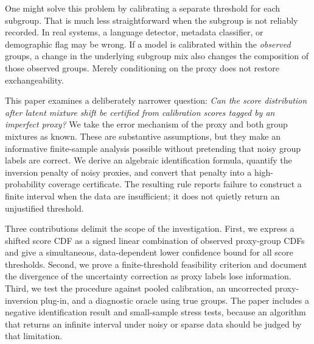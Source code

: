 \documentclass[twoside,11pt]{article}
\begin{document}
One might solve this problem by calibrating a separate threshold for each subgroup. That is much less straightforward when the subgroup is not reliably recorded. In real systems, a language detector, metadata classifier, or demographic flag may be wrong. If a model is calibrated within the \emph{observed} groups, a change in the underlying subgroup mix also changes the composition of those observed groups. Merely conditioning on the proxy does not restore exchangeability.

This paper examines a deliberately narrower question: \emph{Can the score distribution after latent mixture shift be certified from calibration scores tagged by an imperfect proxy?} We take the error mechanism of the proxy and both group mixtures as known. These are substantive assumptions, but they make an informative finite-sample analysis possible without pretending that noisy group labels are correct. We derive an algebraic identification formula, quantify the inversion penalty of noisy proxies, and convert that penalty into a high-probability coverage certificate. The resulting rule reports failure to construct a finite interval when the data are insufficient; it does not quietly return an unjustified threshold.

Three contributions delimit the scope of the investigation. First, we express a shifted score CDF as a signed linear combination of observed proxy-group CDFs and give a simultaneous, data-dependent lower confidence bound for all score thresholds. Second, we prove a finite-threshold feasibility criterion and document the divergence of the uncertainty correction as proxy labels lose information. Third, we test the procedure against pooled calibration, an uncorrected proxy-inversion plug-in, and a diagnostic oracle using true groups. The paper includes a negative identification result and small-sample stress tests, because an algorithm that returns an infinite interval under noisy or sparse data should be judged by that limitation.
\end{document}
